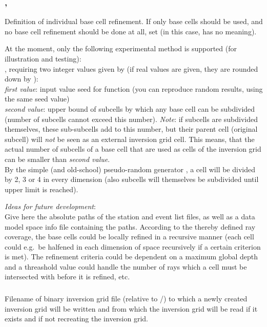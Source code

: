 \subsubsection{, }
Definition of individual base cell refinement. If only base cells should be used, and no base cell refinement
should be done at all, set  (in this case,  has
no meaning).

At the moment, only the following experimental method is supported (for illustration and testing):\\
 , requiring 
two integer values given by   (if real values are given, 
they are rounded down by ):\\
\emph{first value}: 
input value seed for function  (you can reproduce random results, using the same seed value)\\
\emph{second value}: upper bound of subcells by which any base cell can be subdivided (number of subcells cannot exceed
this number). \emph{Note}: if subcells are subdivided themselves, these sub-subcells add to this number,
but their parent cell (original subcell) will \emph{not} be seen as an external inversion grid cell. This
means, that the actual number of subcells of a base cell that are used as cells of the inversion grid can be 
smaller than \emph{second value}.\\
By the simple (and old-school) pseudo-random generator , a cell will be divided by 2, 3 or 4 in 
every dimension (also subcells will themselves be subdivided until upper limit is reached).

\emph{Ideas for future development}:\\ 
Give here the absolute paths of the station and event list files, as well 
as a data model space info file containing the paths. According to the 
thereby defined ray coverage, the base cells could be locally refined in 
a recursive manner (each cell could e.g.\ be halfened in each dimension of 
space recursively if a certain criterion is met). 
The refinement criteria could be dependent on a maximum global depth and
a threashold value could handle the number of rays which a cell
must be intersected with before it is refined, etc.

\subsubsection{}
Filename of binary inversion grid file (relative to /)
to which a newly created inversion grid will be written and from which the inversion grid
will be read if it exists and if not recreating the inversion grid.
